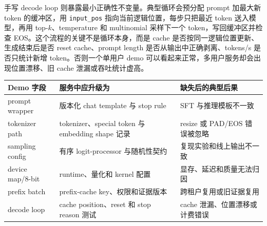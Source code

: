 \documentclass[UTF8,zihao=-4,openany]{ctexbook}
\begin{document}
手写 decode loop 则暴露最小正确性不变量。典型循环会预分配 prompt 加最大新 token 的缓冲区，用 \texttt{input\_pos} 指向当前逻辑位置，每步只把最近 token 送入模型，再用 top-$k$、temperature 和 multinomial 采样下一个 token，写回缓冲区并检查 EOS。这个流程的关键不是循环本身，而是 cache 是否按同一逻辑位置更新、生成结束后是否 reset cache、prompt length 是否从输出中正确剥离、tokens/s 是否只统计新增 token。否则一个单用户 demo 可以看起来正常，多用户服务却会出现位置漂移、旧 cache 泄漏或吞吐统计虚高。

\begin{center}
\small
\setlength{\tabcolsep}{3pt}
\begin{tabular}{@{}p{}p{}p{}@{}}
\toprule
Demo 字段 & 服务中应升级为 & 缺失后的典型后果 \\
\midrule
prompt wrapper & 版本化 chat template 与 stop rule & SFT 与推理模板不一致 \\
tokenizer path & tokenizer、special token 与 embedding shape 记录 & resize 或 PAD/EOS 错误被忽略 \\
sampling config & 有序 logit-processor 与随机性契约 & 复现实验和线上输出不一致 \\
device map/8-bit & runtime、量化和 kernel 配置 & 显存、延迟和质量无法归因 \\
prefix batch & prefix-cache key、权限和证据版本 & 跨租户复用或旧证据复用 \\
decode loop & cache position、reset 和 stop reason 测试 & cache 泄漏、位置漂移或计费错误 \\
\bottomrule
\end{tabular}
\end{center}
\end{document}
